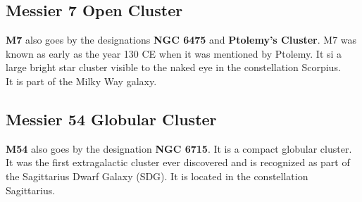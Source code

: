 \documentclass[12pt, twocolumn]{article}
\begin{document}
		\subsection{Messier 7 Open Cluster}
		\textbf{M7} also goes by the designations \textbf{NGC 6475} and \textbf{Ptolemy's Cluster}. M7 was known as early as the year 130 CE when it was mentioned by Ptolemy. It si a large bright star cluster visible to the naked eye in the constellation Scorpius.\\
		It is part of the Milky Way galaxy.
		
		\subsection{Messier 54 Globular Cluster}
		\textbf{M54} also goes by the designation \textbf{NGC 6715}. It is a compact globular cluster.\\
		It was the first extragalactic cluster ever discovered and is recognized as part of the Sagittarius Dwarf Galaxy (SDG). It is located in the constellation Sagittarius.
	
	
	
	
\end{document}
